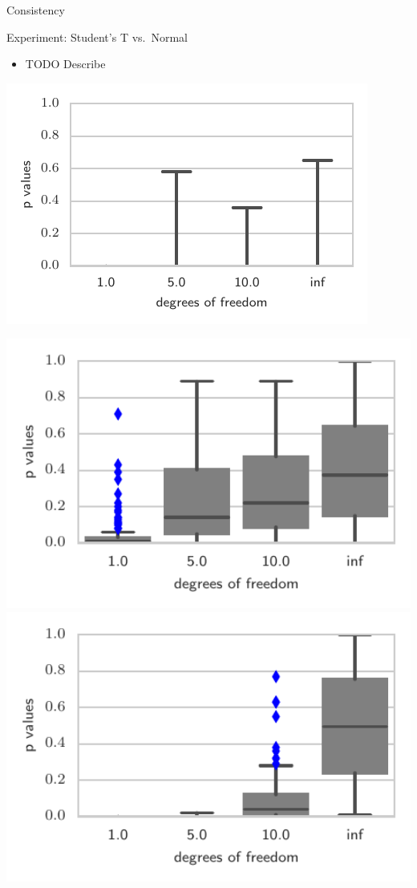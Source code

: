 \begin{frame}
\begin{columns}
\begin{column}{.32\linewidth}
\begin{block}{Consistency}
\end{block}


\vspace{-0.75cm}
\begin{block}{Experiment: Student's T vs.\ Normal}
\begin{minipage}{.60\linewidth}
\begin{itemize}
\item TODO Describe
\end{itemize}
\includegraphics[width=.7\textwidth]{../../presentation/img/sgld_student_bad}
\end{minipage}
\begin{minipage}{.35\linewidth}
\includegraphics[width=1\textwidth]{../../presentation/img/sgld_student}\\
 \includegraphics[width=1\textwidth]{../../presentation/img/sgld_student_opt} 

\end{minipage}
\end{block}
\end{column}
\end{columns}
\end{frame}
